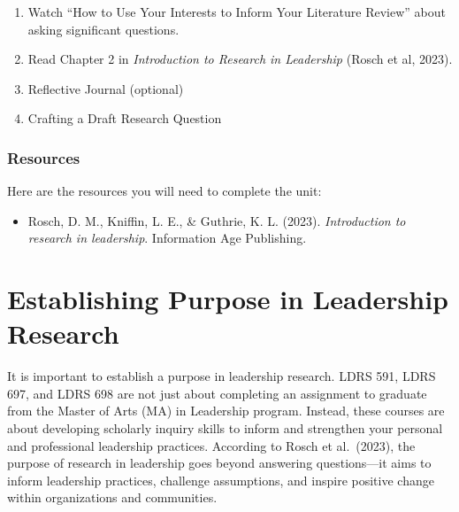 \documentclass[
  letterpaper,
  DIV=11,
  numbers=noendperiod]{scrreprt}
\providecommand{\tightlist}{%
  \setlength{\itemsep}{0pt}\setlength{\parskip}{0pt}}\usepackage{longtable,booktabs,array}
\begin{document}
\begin{enumerate}
\def\labelenumi{\arabic{enumi}.}
\tightlist
\item
  Watch ``How to Use Your Interests to Inform Your Literature Review''
  about asking significant questions.
\item
  Read Chapter 2 in \emph{Introduction to Research in Leadership} (Rosch
  et al, 2023).
\item
  Reflective Journal (optional)
\item
  Crafting a Draft Research Question
\end{enumerate}

\subsection*{Resources}\label{resources-2}

Here are the resources you will need to complete the unit:

\begin{itemize}
\tightlist
\item
  Rosch, D. M., Kniffin, L. E., \& Guthrie, K. L. (2023).
  \emph{Introduction to research in leadership}. Information Age
  Publishing.
\end{itemize}


\chapter*{}\label{section-2}

\markboth{}{}


\chapter*{Establishing Purpose in Leadership
Research}\label{establishing-purpose-in-leadership-research}


It is important to establish a purpose in leadership research. LDRS 591,
LDRS 697, and LDRS 698 are not just about completing an assignment to
graduate from the Master of Arts (MA) in Leadership program. Instead,
these courses are about developing scholarly inquiry skills to inform
and strengthen your personal and professional leadership practices.
According to Rosch et al.~(2023), the purpose of research in leadership
goes beyond answering questions---it aims to inform leadership
practices, challenge assumptions, and inspire positive change within
organizations and communities.
\end{document}
